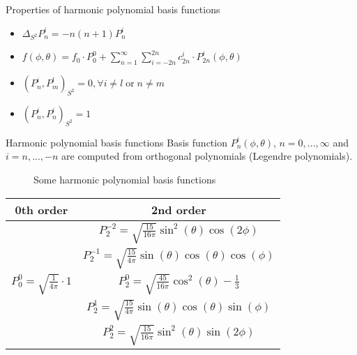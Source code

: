 \begin{frame}{Properties of harmonic polynomial basis functions}
	\begin{itemize}
		\item $\Delta_{S^2}P^i_n = -n(n+1) P^i_n$
		\vspace{12pt}
		\item $	f(\phi, \theta) = f_0 \cdot P_0^0 + \sum_{n=1}^{\infty} \sum_{i=-2n}^{2n} c^i_{2n} \cdot P^i_{2n}(\phi, \theta)$
		\vspace{12pt}
		\item $(P^i_n, P^l_m)_{S^2} = 0, \forall i \neq l \; \text{or} \; n \neq m$
		\vspace{12pt}
		\item $	(P^i_n, P^i_n)_{S^2} = 1$
	\end{itemize}
\end{frame}

\begin{frame}{Harmonic polynomial basis functions}
	\scriptsize
	Basis function ${P}^{i}_{n}(\phi, \theta)$, $n = 0, ..., \infty$ and $i = n, ..., -n$ are computed from orthogonal polynomials (Legendre polynomials). 
	\vspace{20pt}
	\begin{figure}
		\centering
		\qquad
		\qquad
		\qquad
		\caption{Some harmonic polynomial basis functions}
	\end{figure}
	
	\begin{minipage}[b]{0.4\textwidth}
		\begin{table}[H]
			\tiny
			\begin{tabular}{|c|c|}
				\hline
				0th order & 2nd order \\
				\hline
				& $P^{-2}_2 = \sqrt{\frac{15}{16\pi}}\sin^2(\theta)\cos(2\phi)$ \\
				& $P^{-1}_2 = \sqrt{\frac{15}{4\pi}}\sin(\theta)\cos(\theta)\cos(\phi)$ \\
				$P^0_0 = \sqrt{\frac{1}{4\pi}} \cdot 1$ & $P^0_2 = \sqrt{\frac{45}{16\pi}}\cos^2(\theta) - \frac{1}{3}$ \\
				& $P^1_2 = \sqrt{\frac{15}{4\pi}}\sin(\theta)\cos(\theta)\sin(\phi)$\\
				& $P^2_2 = \sqrt{\frac{15}{16\pi}}\sin^2(\theta)\sin(2\phi)$\\
				\hline
			\end{tabular}
		\end{table}
	\end{minipage}
\end{frame}

